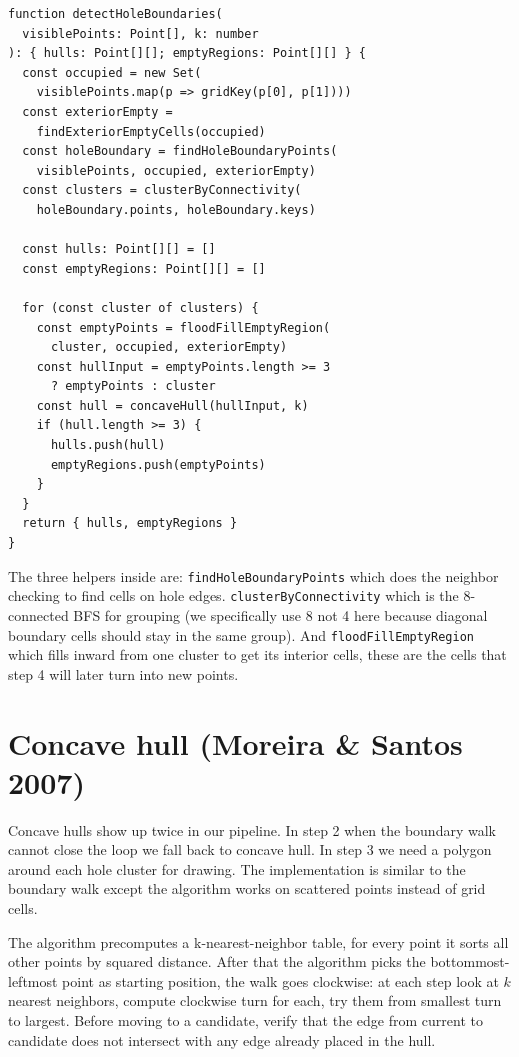 \documentclass[12pt]{extreport}
\begin{document}
\begin{lstlisting}[style=tsstyle, caption={Hole detection pipeline (\texttt{grid.ts})}]
function detectHoleBoundaries(
  visiblePoints: Point[], k: number
): { hulls: Point[][]; emptyRegions: Point[][] } {
  const occupied = new Set(
    visiblePoints.map(p => gridKey(p[0], p[1])))
  const exteriorEmpty =
    findExteriorEmptyCells(occupied)
  const holeBoundary = findHoleBoundaryPoints(
    visiblePoints, occupied, exteriorEmpty)
  const clusters = clusterByConnectivity(
    holeBoundary.points, holeBoundary.keys)

  const hulls: Point[][] = []
  const emptyRegions: Point[][] = []

  for (const cluster of clusters) {
    const emptyPoints = floodFillEmptyRegion(
      cluster, occupied, exteriorEmpty)
    const hullInput = emptyPoints.length >= 3
      ? emptyPoints : cluster
    const hull = concaveHull(hullInput, k)
    if (hull.length >= 3) {
      hulls.push(hull)
      emptyRegions.push(emptyPoints)
    }
  }
  return { hulls, emptyRegions }
}
\end{lstlisting}

The three helpers inside are: \texttt{findHoleBoundaryPoints} which does the neighbor checking to find cells on hole edges. \texttt{clusterByConnectivity} which is the 8-connected BFS for grouping (we specifically use 8 not 4 here because diagonal boundary cells should stay in the same group). And \texttt{floodFillEmptyRegion} which fills inward from one cluster to get its interior cells, these are the cells that step 4 will later turn into new points.

\section{Concave hull (Moreira \& Santos 2007)}

Concave hulls show up twice in our pipeline. In step 2 when the boundary walk cannot close the loop we fall back to concave hull. In step 3 we need a polygon around each hole cluster for drawing. The implementation is similar to the boundary walk except the algorithm works on scattered points instead of grid cells.

The algorithm precomputes a k-nearest-neighbor table, for every point it sorts all other points by squared distance. After that the algorithm picks the bottommost-leftmost point as starting position, the walk goes clockwise: at each step look at $k$ nearest neighbors, compute clockwise turn for each, try them from smallest turn to largest. Before moving to a candidate, verify that the edge from current to candidate does not intersect with any edge already placed in the hull.
\end{document}
